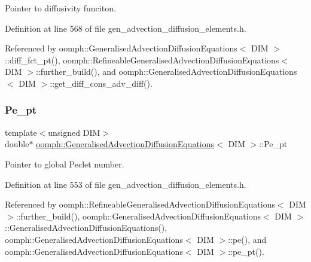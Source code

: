 Pointer to diffusivity funciton. 



Definition at line 568 of file gen\+\_\+advection\+\_\+diffusion\+\_\+elements.\+h.



Referenced by oomph\+::\+Generalised\+Advection\+Diffusion\+Equations$<$ D\+I\+M $>$\+::diff\+\_\+fct\+\_\+pt(), oomph\+::\+Refineable\+Generalised\+Advection\+Diffusion\+Equations$<$ D\+I\+M $>$\+::further\+\_\+build(), and oomph\+::\+Generalised\+Advection\+Diffusion\+Equations$<$ D\+I\+M $>$\+::get\+\_\+diff\+\_\+cons\+\_\+adv\+\_\+diff().

\mbox{\label{classoomph_1_1GeneralisedAdvectionDiffusionEquations_a1d8bbbe41954ea99f8eec70882f84932}} 
\subsubsection{\texorpdfstring{Pe\+\_\+pt}{Pe\_pt}}
{\footnotesize\ttfamily template$<$unsigned D\+IM$>$ \\
double$\ast$ \hyperlink{classoomph_1_1GeneralisedAdvectionDiffusionEquations}{oomph\+::\+Generalised\+Advection\+Diffusion\+Equations}$<$ D\+IM $>$\+::Pe\+\_\+pt\hspace{0.3cm}{\ttfamily [protected]}}



Pointer to global Peclet number. 



Definition at line 553 of file gen\+\_\+advection\+\_\+diffusion\+\_\+elements.\+h.



Referenced by oomph\+::\+Refineable\+Generalised\+Advection\+Diffusion\+Equations$<$ D\+I\+M $>$\+::further\+\_\+build(), oomph\+::\+Generalised\+Advection\+Diffusion\+Equations$<$ D\+I\+M $>$\+::\+Generalised\+Advection\+Diffusion\+Equations(), oomph\+::\+Generalised\+Advection\+Diffusion\+Equations$<$ D\+I\+M $>$\+::pe(), and oomph\+::\+Generalised\+Advection\+Diffusion\+Equations$<$ D\+I\+M $>$\+::pe\+\_\+pt().

\mbox{\label{classoomph_1_1GeneralisedAdvectionDiffusionEquations_a8f77e17bba1c7666679abf0fa6150733}} 
